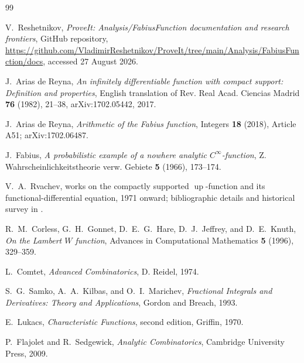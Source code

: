 \documentclass[11pt,oneside]{article}
\theoremstyle{definition}
\newcommand{\upf}{\operatorname{up}}
\begin{document}
\begin{thebibliography}{99}

V.~Reshetnikov,
\emph{ProveIt: Analysis/FabiusFunction documentation and research frontiers},
GitHub repository,
\url{https://github.com/VladimirReshetnikov/ProveIt/tree/main/Analysis/FabiusFunction/docs},
accessed 27 August 2026.

J.~Arias de Reyna,
\emph{An infinitely differentiable function with compact support: Definition and
properties},
English translation of Rev. Real Acad. Ciencias Madrid \textbf{76} (1982), 21--38,
arXiv:1702.05442, 2017.

J.~Arias de Reyna,
\emph{Arithmetic of the Fabius function},
Integers \textbf{18} (2018), Article A51; arXiv:1702.06487.

J.~Fabius,
\emph{A probabilistic example of a nowhere analytic \(C^\infty\)-function},
Z. Wahrscheinlichkeitstheorie verw. Gebiete \textbf{5} (1966), 173--174.

V.~A.~Rvachev,
works on the compactly supported \(\upf\)-function and its functional-differential
equation, 1971 onward; bibliographic details and historical survey in
\cite{Arias1982,AriasArithmetic}.

R.~M.~Corless, G.~H.~Gonnet, D.~E.~G.~Hare, D.~J.~Jeffrey, and D.~E.~Knuth,
\emph{On the Lambert \(W\) function},
Advances in Computational Mathematics \textbf{5} (1996), 329--359.

L.~Comtet,
\emph{Advanced Combinatorics},
D. Reidel, 1974.

S.~G.~Samko, A.~A.~Kilbas, and O.~I.~Marichev,
\emph{Fractional Integrals and Derivatives: Theory and Applications},
Gordon and Breach, 1993.

E.~Lukacs,
\emph{Characteristic Functions}, second edition,
Griffin, 1970.

P.~Flajolet and R.~Sedgewick,
\emph{Analytic Combinatorics},
Cambridge University Press, 2009.

\end{thebibliography}
\end{document}
